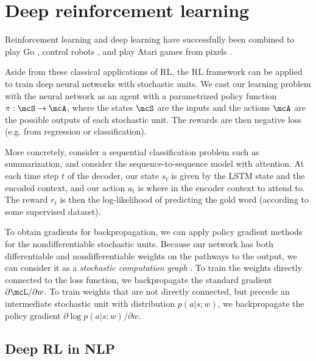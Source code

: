 \documentclass[11pt]{report}
\begin{document}


\section{Deep reinforcement learning}

Reinforcement learning and deep learning have successfully been combined to play Go \citep{Silver2016}, 
control robots \citep{Lillicrap2016}, and play Atari games from pixels \citep{deepatari2015}.

Aside from these classical applications of RL, the RL framework can be applied to train deep neural networks with stochastic units. We cast our learning problem with the neural network as an agent with a parametrized policy function $\pi : \mcS \to \mcA$, where the states $\mcS$ are the inputs and the actions $\mcA$ are the possible outputs of each stochastic unit. The rewards are then negative loss (e.g. from regression or classification).

More concretely, consider a sequential classification problem such as summarization, and consider the sequence-to-sequence model with attention. At each time step $t$ of the decoder, our state $s_t$ is given by the LSTM state and the encoded context, and our action $a_t$ is where in the encoder context to attend to. The reward $r_t$ is then the log-likelihood of predicting the gold word (according to some supervised dataset).


To obtain gradients for backpropagation, we can apply policy gradient methods for the nondifferentiable stochastic units. Because our network has both differentiable and nondifferentiable weights on the pathways to the output, we can consider it as a \emph{stochastic computation graph} \citep{schulman2015backprop}. To train the weights directly connected to the loss function, we backpropagate the standard gradient $\partial \mcL / \partial w$. To train weights that are not directly connected, but precede an intermediate stochastic unit with distribution $p(a | s ; w)$, we backpropagate the policy gradient $\partial \log p(a | s; w) / \partial w$.



\subsection{Deep RL in NLP}
\end{document}
